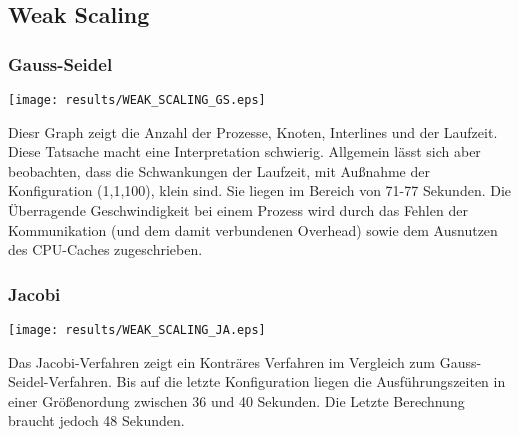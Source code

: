 \documentclass[a4paper,12pt]{scrartcl}
\title{\titleinfo}
\author{Johannes Timm \and Guannan Hu}
\date{\today}
\begin{document}
\maketitle
\notag


\subsection{Weak Scaling}
\subsubsection{Gauss-Seidel}
\texttt{[image: results/WEAK\_SCALING\_GS.eps]}



Diesr Graph zeigt die Anzahl der Prozesse, Knoten, Interlines und der 
Laufzeit. Diese Tatsache macht eine Interpretation schwierig. 
Allgemein lässt sich aber beobachten, dass die Schwankungen der Laufzeit, mit Außnahme der Konfiguration (1,1,100), klein sind.
Sie liegen im Bereich von 71-77 Sekunden. Die Überragende Geschwindigkeit bei einem Prozess wird durch das Fehlen der Kommunikation (und dem damit verbundenen Overhead) sowie dem Ausnutzen des CPU-Caches zugeschrieben.
\subsubsection{Jacobi}
\texttt{[image: results/WEAK\_SCALING\_JA.eps]}


Das Jacobi-Verfahren zeigt ein Konträres Verfahren im Vergleich zum Gauss-Seidel-Verfahren. 
Bis auf die letzte Konfiguration liegen die Ausführungszeiten in einer Größenordung zwischen 36 und 40 Sekunden.
Die Letzte Berechnung braucht jedoch 48 Sekunden.
\end{document}
